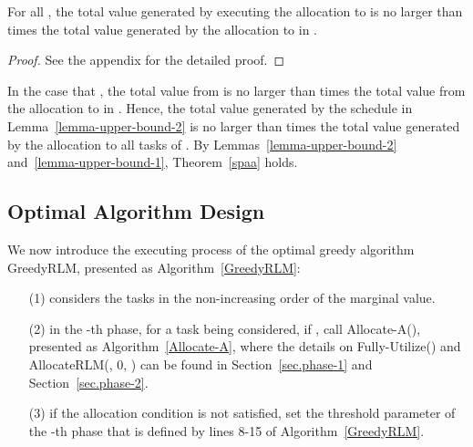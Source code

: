 \documentclass[10pt,journal,compsoc]{IEEEtran}
\begin{document}
\begin{lemma}\label{lemma-interval-value}
For all , the total value generated by executing the allocation to  is no larger than  times the total value generated by the allocation to  in .
\end{lemma}
\begin{proof}
See the appendix for the detailed proof.
\end{proof}

In the case that , the total value from  is no larger than  times the total value from the allocation to  in . Hence, the total value generated by the schedule in Lemma~\ref{lemma-upper-bound-2} is no larger than  times the total value generated by the allocation to all tasks of . By Lemmas~\ref{lemma-upper-bound-2} and~\ref{lemma-upper-bound-1}, Theorem~\ref{spaa} holds.









\subsection{Optimal Algorithm Design}


We now introduce the executing process of the optimal greedy algorithm GreedyRLM, presented as Algorithm~\ref{GreedyRLM}:
\begin{itemize}
 \setlength\itemsep{0.15em}
\item [(1)] considers the tasks in the non-increasing order of the marginal value.

\item [(2)] in the -th phase, for a task  being considered, if , call Allocate-A(), presented as Algorithm~\ref{Allocate-A}, where the details on Fully-Utilize() and AllocateRLM(, 0, ) can be found in Section~\ref{sec.phase-1} and Section~\ref{sec.phase-2}.

\item [(3)] if the allocation condition is not satisfied, set the threshold parameter  of the -th phase that is defined by lines 8-15 of Algorithm~\ref{GreedyRLM}.
\end{itemize}
\end{document}
